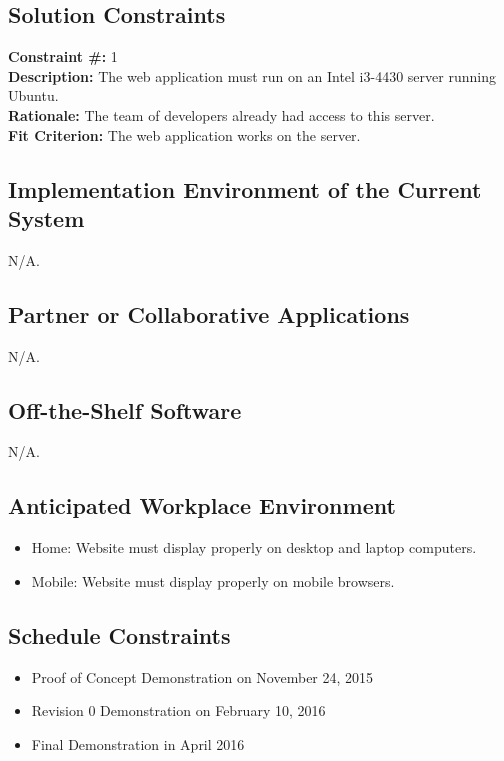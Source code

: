\documentclass[12pt]{article}
\begin{document}
\subsection{Solution Constraints}
\textbf{Constraint \#:} 1 \\
\textbf{Description: } The web application must run on an Intel i3-4430 server running Ubuntu. \\
\textbf{Rationale: } The team of developers already had access to this server. \\
\textbf{Fit Criterion: } The web application works on the server.

\subsection{Implementation Environment of the Current System}
N/A.

\subsection{Partner or Collaborative Applications} 
N/A.
    
\subsection{Off-the-Shelf Software} 
N/A.
    
\subsection{Anticipated Workplace Environment} 
    \begin{itemize}
    \item Home: Website must display properly on desktop and laptop computers.
    \item Mobile: Website must display properly on mobile browsers. 
    \end{itemize}
    
\subsection{Schedule Constraints} 
    \begin{itemize}
    \item Proof of Concept Demonstration on November 24, 2015
    \item Revision 0 Demonstration on February 10, 2016
    \item Final Demonstration in April 2016
    \end{itemize}
    
\end{document}
